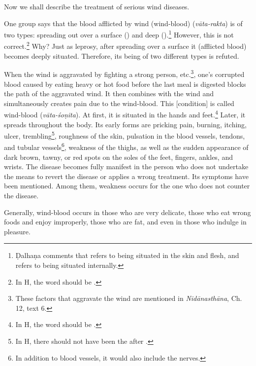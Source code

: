 \begin{translation}
    
    \item [1]
    Now we shall describe the treatment of serious wind diseases.
    
    \item [2]

    \item [3]
    One group says that the blood afflicted by wind (wind-blood) (\textit{vāta-rakta}) is of two types: spreading out over a surface () and deep ().\footnote{Ḍalhaṇa comments that  refers to being situated in the skin and flesh, and  refers to being situated internally.} However, this is not correct.\footnote{In H, the word  should be .} Why? Just as leprosy, after spreading over a surface it (afflicted blood) becomes deeply situated. Therefore, its being of two different types is refuted.  

    \item[4]
    When the wind is aggravated by fighting a strong person, etc.\footnote{These factors that aggravate the wind are mentioned in \textit{Nidānasthāna}, Ch. 12, text 6.}, one's corrupted blood caused by eating heavy or hot food before the last meal is digested blocks the path of the aggravated wind. It then combines with the wind and simultaneously creates pain due to the wind-blood. This [condition] is called wind-blood (\textit{vāta-śoṇita}). At first, it is situated in the hands and feet.\footnote{In H, the word  should be .} Later, it spreads throughout the body. Its early forms are pricking pain, burning, itching, ulcer, trembling\footnote{In H, there should not have been the  after .}, roughness of the skin, pulsation in the blood vessels, tendons, and tubular vessels\footnote{In addition to blood vessels, it would also include the nerves.}, weakness of the thighs, as well as the sudden appearance of dark brown, tawny, or red spots on the soles of the feet, fingers, ankles, and wrists. The disease becomes fully manifest in the person who does not undertake the means to revert the disease or applies a wrong treatment. Its symptoms have been mentioned. Among them, weakness occurs for the one who does not counter the disease.

    \item[5]
    Generally, wind-blood occurs in those who are very delicate, those who eat wrong foods and enjoy improperly, those who are fat, and even in those who indulge in pleasure.  


\end{translation}
